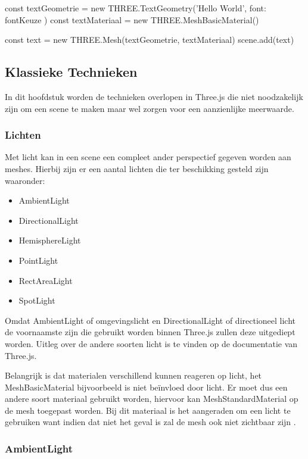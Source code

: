 \begin{LVerbatim}
const textGeometrie = new THREE.TextGeometry('Hello World', { font: fontKeuze })
const textMateriaal = new THREE.MeshBasicMaterial()

const text = new THREE.Mesh(textGeometrie, textMateriaal)
scene.add(text)
\end{LVerbatim}

\subsection{Klassieke Technieken}

In dit hoofdstuk worden de technieken overlopen in Three.js die niet noodzakelijk zijn om een scene te maken maar wel zorgen voor een aanzienlijke meerwaarde.

\subsubsection{Lichten}

Met licht kan in een scene een compleet ander perspectief gegeven worden aan meshes. Hierbij zijn er een aantal lichten die ter beschikking gesteld zijn waaronder:

\begin{itemize}
	\item AmbientLight
	\item DirectionalLight
	\item HemisphereLight
	\item PointLight
	\item RectAreaLight
	\item SpotLight
\end{itemize}

Omdat AmbientLight of omgevingslicht en DirectionalLight of directioneel licht de voornaamste zijn die gebruikt worden binnen Three.js zullen deze uitgediept worden. Uitleg over de andere soorten licht is te vinden op de documentatie van Three.js.

Belangrijk is dat materialen verschillend kunnen reageren op licht, het MeshBasicMaterial bijvoorbeeld is niet beïnvloed door licht. Er moet dus een andere soort materiaal gebruikt worden, hiervoor kan MeshStandardMaterial op de mesh toegepast worden. Bij dit materiaal is het aangeraden om een licht te gebruiken want indien dat niet het geval is zal de mesh ook niet zichtbaar zijn \autocite{Simon2023}.

\subsubsection{AmbientLight}


